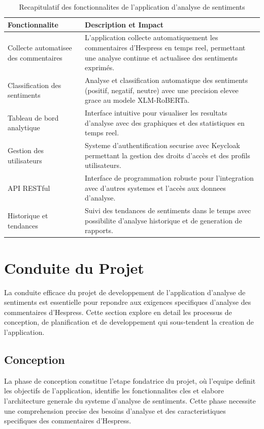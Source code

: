 \begin{table}[H]
\centering
\begin{tabularx}{\textwidth}{|l|X|}
\hline
\textbf{Fonctionnalite} & \textbf{Description et Impact} \\
\hline
Collecte automatisee des commentaires & 
L'application collecte automatiquement les commentaires d'Hespress en temps reel, permettant une analyse continue et actualisee des sentiments exprimés. \\
\hline
Classification des sentiments & 
Analyse et classification automatique des sentiments (positif, negatif, neutre) avec une precision elevee grace au modele XLM-RoBERTa. \\
\hline
Tableau de bord analytique & 
Interface intuitive pour visualiser les resultats d'analyse avec des graphiques et des statistiques en temps reel. \\
\hline
Gestion des utilisateurs & 
Systeme d'authentification securise avec Keycloak permettant la gestion des droits d'accès et des profils utilisateurs. \\
\hline
API RESTful & 
Interface de programmation robuste pour l'integration avec d'autres systemes et l'accès aux donnees d'analyse. \\
\hline
Historique et tendances & 
Suivi des tendances de sentiments dans le temps avec possibilite d'analyse historique et de generation de rapports. \\
\hline
\end{tabularx}
\caption{Recapitulatif des fonctionnalites de l'application d'analyse de sentiments}
\label{tab:fonctionnalites}
\end{table}

\section{Conduite du Projet}

La conduite efficace du projet de developpement de l'application d'analyse de sentiments est essentielle pour repondre aux exigences specifiques d'analyse des commentaires d'Hespress. Cette section explore en detail les processus de conception, de planification et de developpement qui sous-tendent la creation de l'application.

\subsection{Conception}

La phase de conception constitue l'etape fondatrice du projet, où l'equipe definit les objectifs de l'application, identifie les fonctionnalites cles et elabore l'architecture generale du systeme d'analyse de sentiments. Cette phase necessite une comprehension precise des besoins d'analyse et des caracteristiques specifiques des commentaires d'Hespress.

